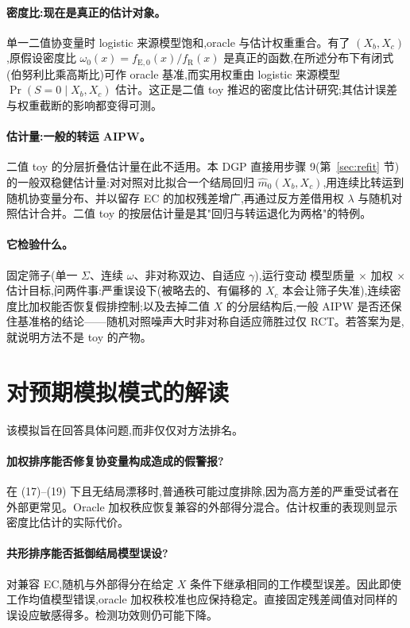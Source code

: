 \documentclass[11pt]{article}
\newcommand{\R}{\mathrm{R}}
\newcommand{\E}{\mathrm{E}}
\begin{document}
\paragraph{密度比:现在是真正的估计对象。} 单一二值协变量时 logistic 来源模型饱和,oracle 与估计权重重合。有了 $(X_b,X_c)$,原假设密度比 $\omega_0(x)=f_{\E,0}(x)/f_{\R}(x)$ 是真正的函数,在所述分布下有闭式(伯努利比乘高斯比)可作 oracle 基准,而实用权重由 logistic 来源模型 $\Pr(S{=}0\mid X_b,X_c)$ 估计。这正是二值 toy 推迟的密度比估计研究;其估计误差与权重截断的影响都变得可测。

\paragraph{估计量:一般的转运 AIPW。} 二值 toy 的分层折叠估计量在此不适用。本 DGP 直接用步骤 9(第~\ref{sec:refit} 节)的一般双稳健估计量:对对照对比拟合一个结局回归 $\widehat m_0(X_b,X_c)$,用连续比转运到随机协变量分布、并以留存 EC 的加权残差增广,再通过反方差借用权 $\lambda$ 与随机对照估计合并。二值 toy 的按层估计量是其"回归与转运退化为两格"的特例。

\paragraph{它检验什么。} 固定筛子(单一 $\Sigma$、连续 $\omega$、非对称双边、自适应 $\gamma$),运行变动 模型质量 $\times$ 加权 $\times$ 估计目标,问两件事:严重误设下(被略去的、有偏移的 $X_c$ 本会让筛子失准),连续密度比加权能否恢复假排控制;以及去掉二值 $X$ 的分层结构后,一般 AIPW 是否还保住基准格的结论——随机对照噪声大时非对称自适应筛胜过仅 RCT。若答案为是,就说明方法不是 toy 的产物。

\section{对预期模拟模式的解读}

该模拟旨在回答具体问题,而非仅仅对方法排名。

\paragraph{加权排序能否修复协变量构成造成的假警报?}
在 (17)--(19) 下且无结局漂移时,普通秩可能过度排除,因为高方差的严重受试者在外部更常见。Oracle 加权秩应恢复兼容的外部得分混合。估计权重的表现则显示密度比估计的实际代价。

\paragraph{共形排序能否抵御结局模型误设?}
对兼容 EC,随机与外部得分在给定 $X$ 条件下继承相同的工作模型误差。因此即使工作均值模型错误,oracle 加权秩校准也应保持稳定。直接固定残差阈值对同样的误设应敏感得多。检测功效则仍可能下降。
\end{document}
